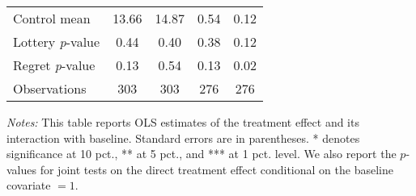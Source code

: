 \begin{table}[ht]
{\begin{threeparttable}
\begin{tabular}{l*{4}{c}}
Control mean    &    13.66         &    14.87         &     0.54         &     0.12         \\
Lottery \emph{p}-value&     0.44         &     0.40         &     0.38         &     0.12         \\
Regret \emph{p}-value&     0.13         &     0.54         &     0.13         &     0.02         \\
Observations    &      303         &      303         &      276         &      276         \\
\bottomrule \end{tabular} \begin{tablenotes}[flushleft] \footnotesize \item \emph{Notes:} This table reports OLS estimates of the treatment effect and its interaction with baseline. Standard errors are in parentheses. * denotes significance at 10 pct., ** at 5 pct., and *** at 1 pct. level. We also report the \(p\)-values for joint tests on the direct treatment effect conditional on the baseline covariate $= 1$. \end{tablenotes} \end{threeparttable} } \end{table}

